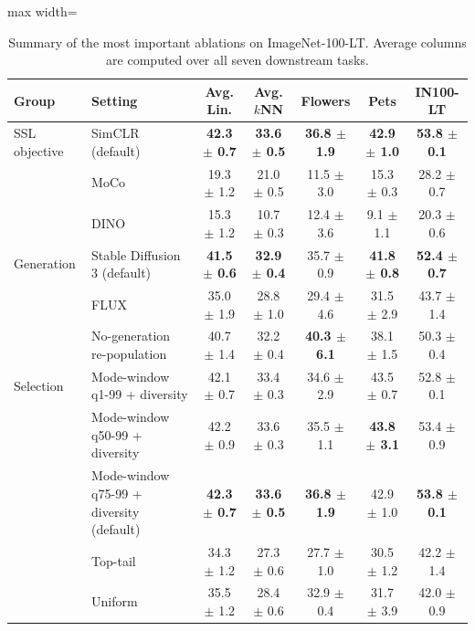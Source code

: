 \begin{table}[t]
\centering
\scriptsize
\setlength{\tabcolsep}{3.5pt}
\caption{Summary of the most important ablations on ImageNet-100-LT. Average columns are computed over all seven downstream tasks.}
\label{tab:main_ablation_summary}
\begin{adjustbox}{max width=\textwidth}
\begin{tabular}{l l c c c c c}
\toprule
Group & Setting & Avg. Lin. & Avg. $k$NN & Flowers & Pets & IN100-LT \\
\midrule
SSL objective & SimCLR (default) & \textbf{42.3 {\scriptsize$\pm$ 0.7}} & \textbf{33.6 {\scriptsize$\pm$ 0.5}} & \textbf{36.8 {\scriptsize$\pm$ 1.9}} & \textbf{42.9 {\scriptsize$\pm$ 1.0}} & \textbf{53.8 {\scriptsize$\pm$ 0.1}} \\
 & MoCo & 19.3 {\scriptsize$\pm$ 1.2} & 21.0 {\scriptsize$\pm$ 0.5} & 11.5 {\scriptsize$\pm$ 3.0} & 15.3 {\scriptsize$\pm$ 0.3} & 28.2 {\scriptsize$\pm$ 0.7} \\
 & DINO & 15.3 {\scriptsize$\pm$ 1.2} & 10.7 {\scriptsize$\pm$ 0.3} & 12.4 {\scriptsize$\pm$ 3.6} & 9.1 {\scriptsize$\pm$ 1.1} & 20.3 {\scriptsize$\pm$ 0.6} \\
\midrule
Generation & Stable Diffusion 3 (default) & \textbf{41.5 {\scriptsize$\pm$ 0.6}} & \textbf{32.9 {\scriptsize$\pm$ 0.4}} & 35.7 {\scriptsize$\pm$ 0.9} & \textbf{41.8 {\scriptsize$\pm$ 0.8}} & \textbf{52.4 {\scriptsize$\pm$ 0.7}} \\
 & FLUX & 35.0 {\scriptsize$\pm$ 1.9} & 28.8 {\scriptsize$\pm$ 1.0} & 29.4 {\scriptsize$\pm$ 4.6} & 31.5 {\scriptsize$\pm$ 2.9} & 43.7 {\scriptsize$\pm$ 1.4} \\
 & No-generation re-population & 40.7 {\scriptsize$\pm$ 1.4} & 32.2 {\scriptsize$\pm$ 0.4} & \textbf{40.3 {\scriptsize$\pm$ 6.1}} & 38.1 {\scriptsize$\pm$ 1.5} & 50.3 {\scriptsize$\pm$ 0.4} \\
\midrule
Selection & Mode-window q1-99 + diversity & 42.1 {\scriptsize$\pm$ 0.7} & 33.4 {\scriptsize$\pm$ 0.3} & 34.6 {\scriptsize$\pm$ 2.9} & 43.5 {\scriptsize$\pm$ 0.7} & 52.8 {\scriptsize$\pm$ 0.1} \\
 & Mode-window q50-99 + diversity & 42.2 {\scriptsize$\pm$ 0.9} & 33.6 {\scriptsize$\pm$ 0.3} & 35.5 {\scriptsize$\pm$ 1.1} & \textbf{43.8 {\scriptsize$\pm$ 3.1}} & 53.4 {\scriptsize$\pm$ 0.9} \\
 & Mode-window q75-99 + diversity (default) & \textbf{42.3 {\scriptsize$\pm$ 0.7}} & \textbf{33.6 {\scriptsize$\pm$ 0.5}} & \textbf{36.8 {\scriptsize$\pm$ 1.9}} & 42.9 {\scriptsize$\pm$ 1.0} & \textbf{53.8 {\scriptsize$\pm$ 0.1}} \\
 & Top-tail & 34.3 {\scriptsize$\pm$ 1.2} & 27.3 {\scriptsize$\pm$ 0.6} & 27.7 {\scriptsize$\pm$ 1.0} & 30.5 {\scriptsize$\pm$ 1.2} & 42.2 {\scriptsize$\pm$ 1.4} \\
 & Uniform & 35.5 {\scriptsize$\pm$ 1.2} & 28.4 {\scriptsize$\pm$ 0.6} & 32.9 {\scriptsize$\pm$ 0.4} & 31.7 {\scriptsize$\pm$ 3.9} & 42.0 {\scriptsize$\pm$ 0.9} \\
\bottomrule
\end{tabular}
\end{adjustbox}
\end{table}
